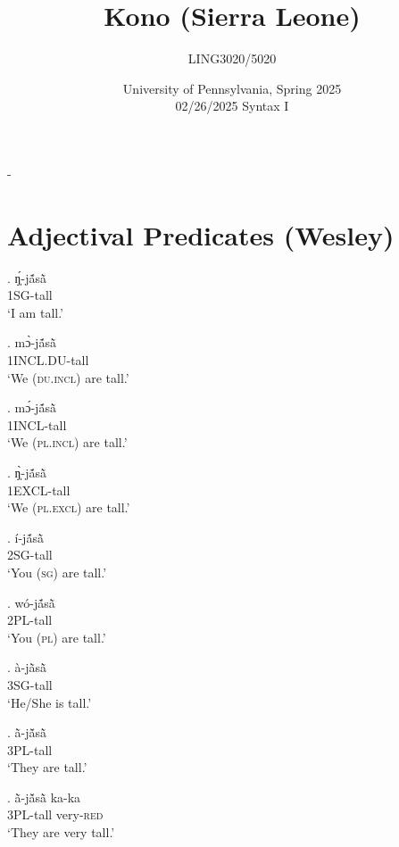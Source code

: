 \documentclass{assets/fieldnotes}
\title{Kono (Sierra Leone)}
\author{LING3020/5020}
\date{University of Pennsylvania, Spring 2025\\02/26/2025 Syntax I}
\begin{document}
\maketitle
\tableofcontents


-
\section{Adjectival Predicates (Wesley)}


\exg. ŋ̩́-jã́sã̀\\
\textsc{1SG}-tall\\
`I am tall.’

\exg. mɔ̀-jã́sã̀\\
\textsc{1INCL.DU}-tall\\
`We (\textsc{du.incl}) are tall.’

\exg. mɔ́-jã́sã̀\\
\textsc{1INCL}-tall\\
`We (\textsc{pl.incl}) are tall.’

\exg. ŋ̩̀-jã́sã̀\\
\textsc{1EXCL}-tall\\
`We (\textsc{pl.excl}) are tall.’

\exg. í-jã́sã̀\\
\textsc{2SG}-tall\\
`You (\textsc{sg}) are tall.’

\exg. wó-jã́sã̀\\
\textsc{2PL}-tall\\
`You (\textsc{pl}) are tall.’

\exg. à-jã̀sã̀\\
\textsc{3SG}-tall\\
`He/She is tall.’

\exg. ã̀-jã̌sã̀\\
\textsc{3PL}-tall\\
`They are tall.’

\exg. ã̀-jã̌sã̀ ka-ka\\
\textsc{3PL}-tall very-\textsc{red}\\
`They are very tall.’

\end{document}

